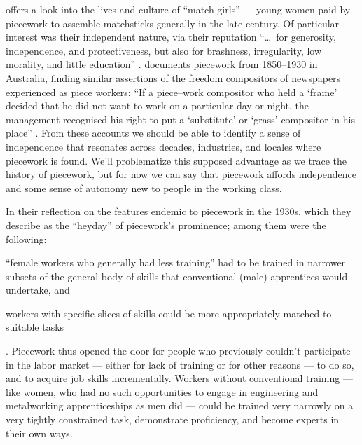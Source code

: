\documentclass[trackingWork]{subfiles}
\begin{document}
\citeauthor{10.2307/3827491} offers a look into the lives and culture of ``match girls''
--- young women paid by piecework to assemble matchsticks generally in the late  century.
Of particular interest was their independent nature, via their reputation ``\dots~for generosity, independence, and protectiveness,
but also for brashness, irregularity, low morality, and little education''
\cite{10.2307/3827491}.
\citeauthor{10.2307/27508091} documents piecework from 1850--1930 in Australia,
finding similar assertions of the freedom compositors of newspapers experienced as piece workers:
``If a piece--work compositor who held a `frame' decided that he did not want to work on a particular day or night,
the management recognised his right to put a `substitute' or `grass' compositor in his place''
\cite{10.2307/27508091}.
From these accounts we should be able to identify
a sense of independence that
resonates across decades, industries, and locales where piecework is found.
We'll problematize this supposed advantage as we trace the history of piecework,
but for now we can say that piecework affords
independence and some sense of autonomy
new to people in the working class.


In their reflection on the features endemic to piecework in the 1930s,
which they describe as the ``heyday'' of piecework's prominence;
among them were the following:
\begin{inlinelist}
\item ``female workers who generally had less training'' had to be trained in narrower subsets of the general body of skills that conventional (male) apprentices would undertake, and
\item workers with specific slices of skills could be more appropriately matched to suitable tasks
\end{inlinelist}
\cite{hart2013rise}.
Piecework thus opened the door for people who previously couldn't participate in the labor market
--- either for lack of training or for other reasons ---
to do so, and to acquire job skills incrementally.
Workers without conventional training
--- like women, who had no such opportunities to engage in engineering and metalworking apprenticeships as men did ---
could be trained very narrowly on a very tightly constrained task,
demonstrate proficiency, and become experts in their own ways.
\end{document}
